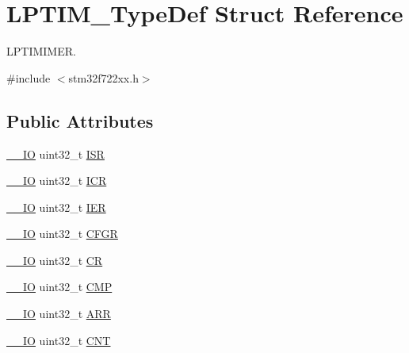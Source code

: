 \hypertarget{struct_l_p_t_i_m___type_def}{}\section{L\+P\+T\+I\+M\+\_\+\+Type\+Def Struct Reference}
\label{struct_l_p_t_i_m___type_def}


L\+P\+T\+I\+M\+I\+M\+ER.  




{\ttfamily \#include $<$stm32f722xx.\+h$>$}

\subsection*{Public Attributes}
\begin{DoxyCompactItemize}
\item 
\mbox{\hyperlink{core__sc300_8h_aec43007d9998a0a0e01faede4133d6be}{\+\_\+\+\_\+\+IO}} uint32\+\_\+t \mbox{\hyperlink{struct_l_p_t_i_m___type_def_a5b270971af377ca8387e65bb9267dd0e}{I\+SR}}
\item 
\mbox{\hyperlink{core__sc300_8h_aec43007d9998a0a0e01faede4133d6be}{\+\_\+\+\_\+\+IO}} uint32\+\_\+t \mbox{\hyperlink{struct_l_p_t_i_m___type_def_a09774178fdd5412dd8f4539f431b15c9}{I\+CR}}
\item 
\mbox{\hyperlink{core__sc300_8h_aec43007d9998a0a0e01faede4133d6be}{\+\_\+\+\_\+\+IO}} uint32\+\_\+t \mbox{\hyperlink{struct_l_p_t_i_m___type_def_a58d1ea360d85b8d4f13e4f6bba594ea7}{I\+ER}}
\item 
\mbox{\hyperlink{core__sc300_8h_aec43007d9998a0a0e01faede4133d6be}{\+\_\+\+\_\+\+IO}} uint32\+\_\+t \mbox{\hyperlink{struct_l_p_t_i_m___type_def_a35c555cdc39e12f291f1e96bdf953ec4}{C\+F\+GR}}
\item 
\mbox{\hyperlink{core__sc300_8h_aec43007d9998a0a0e01faede4133d6be}{\+\_\+\+\_\+\+IO}} uint32\+\_\+t \mbox{\hyperlink{struct_l_p_t_i_m___type_def_aa4900090e51a693ed07d4a90eb45ddf8}{CR}}
\item 
\mbox{\hyperlink{core__sc300_8h_aec43007d9998a0a0e01faede4133d6be}{\+\_\+\+\_\+\+IO}} uint32\+\_\+t \mbox{\hyperlink{struct_l_p_t_i_m___type_def_a0f22edd659052ecb52c692e507a8ebdc}{C\+MP}}
\item 
\mbox{\hyperlink{core__sc300_8h_aec43007d9998a0a0e01faede4133d6be}{\+\_\+\+\_\+\+IO}} uint32\+\_\+t \mbox{\hyperlink{struct_l_p_t_i_m___type_def_a0aa430eedacf1806e078057cd5e6970c}{A\+RR}}
\item 
\mbox{\hyperlink{core__sc300_8h_aec43007d9998a0a0e01faede4133d6be}{\+\_\+\+\_\+\+IO}} uint32\+\_\+t \mbox{\hyperlink{struct_l_p_t_i_m___type_def_a8c510cd4e483030373cb03eb347d65df}{C\+NT}}
\end{DoxyCompactItemize}


